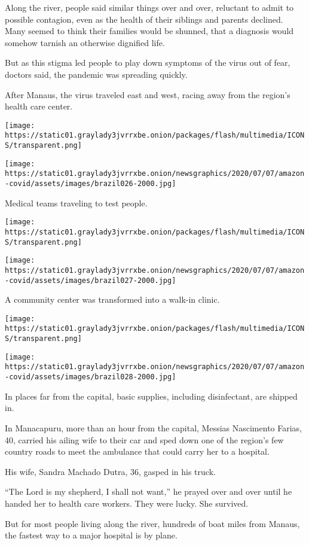 Along the river, people said similar things over and over, reluctant to
admit to possible contagion, even as the health of their siblings and
parents declined. Many seemed to think their families would be shunned,
that a diagnosis would somehow tarnish an otherwise dignified life.

But as this stigma led people to play down symptoms of the virus out of
fear, doctors said, the pandemic was spreading quickly.

After Manaus, the virus traveled east and west, racing away from the
region's health care center.

\texttt{[image: https://static01.graylady3jvrrxbe.onion/packages/flash/multimedia/ICONS/transparent.png]}

\texttt{[image: https://static01.graylady3jvrrxbe.onion/newsgraphics/2020/07/07/amazon-covid/assets/images/brazil026-2000.jpg]}

Medical teams traveling to test people.

\texttt{[image: https://static01.graylady3jvrrxbe.onion/packages/flash/multimedia/ICONS/transparent.png]}

\texttt{[image: https://static01.graylady3jvrrxbe.onion/newsgraphics/2020/07/07/amazon-covid/assets/images/brazil027-2000.jpg]}

A community center was transformed into a walk-in clinic.

\texttt{[image: https://static01.graylady3jvrrxbe.onion/packages/flash/multimedia/ICONS/transparent.png]}

\texttt{[image: https://static01.graylady3jvrrxbe.onion/newsgraphics/2020/07/07/amazon-covid/assets/images/brazil028-2000.jpg]}

In places far from the capital, basic supplies, including disinfectant,
are shipped in.

In Manacapuru, more than an hour from the capital, Messias Nascimento
Farias, 40, carried his ailing wife to their car and sped down one of
the region's few country roads to meet the ambulance that could carry
her to a hospital.

His wife, Sandra Machado Dutra, 36, gasped in his truck.

``The Lord is my shepherd, I shall not want,'' he prayed over and over
until he handed her to health care workers. They were lucky. She
survived.

But for most people living along the river, hundreds of boat miles from
Manaus, the fastest way to a major hospital is by plane.

